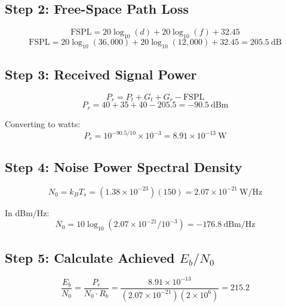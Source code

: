\subsection*{Step 2: Free-Space Path Loss}

\begin{equation}
\mathrm{FSPL} = 20\log_{10}(d) + 20\log_{10}(f) + 32.45
\end{equation}
\begin{equation}
\mathrm{FSPL} = 20\log_{10}(36{,}000) + 20\log_{10}(12{,}000) + 32.45 = 205.5~\text{dB}
\end{equation}

\subsection*{Step 3: Received Signal Power}

\begin{equation}
P_r = P_t + G_t + G_r - \mathrm{FSPL}
\end{equation}
\begin{equation}
P_r = 40 + 35 + 40 - 205.5 = -90.5~\text{dBm}
\end{equation}

Converting to watts:
\begin{equation}
P_r = 10^{-90.5/10} \times 10^{-3} = 8.91 \times 10^{-13}~\text{W}
\end{equation}

\subsection*{Step 4: Noise Power Spectral Density}

\begin{equation}
N_0 = k_B T_s = (1.38 \times 10^{-23})(150) = 2.07 \times 10^{-21}~\text{W/Hz}
\end{equation}

In dBm/Hz:
\begin{equation}
N_0 = 10\log_{10}(2.07 \times 10^{-21} / 10^{-3}) = -176.8~\text{dBm/Hz}
\end{equation}

\subsection*{Step 5: Calculate Achieved $E_b/N_0$}

\begin{equation}
\frac{E_b}{N_0} = \frac{P_r}{N_0 \cdot R_b} = \frac{8.91 \times 10^{-13}}{(2.07 \times 10^{-21})(2 \times 10^6)} = 215.2
\end{equation}

